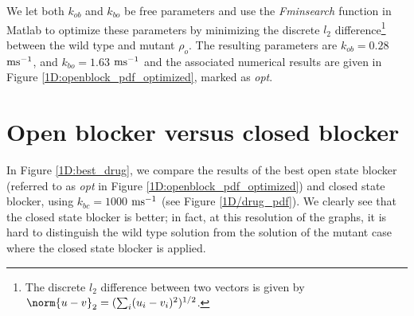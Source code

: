 We let both $k_{ob}$ and $k_{bo}$ be free parameters and use the {\it Fminsearch \label{Fminsearch}} function in Matlab to optimize these parameters by minimizing the discrete $l_2$ difference\footnote{The discrete $l_2$ difference between two vectors is given by
$\norm{u-v}_2=(\sum_i (u_i-v_i)^2)^{1/2}$.} between the wild type and mutant $\rho_o$. 
The resulting parameters are $k_{ob}=0.28$ $\rm{ms^{-1}}$, and $k_{bo}=1.63$ $\rm{ms^{-1}}$
and the associated numerical results are given in Figure \ref{1D:openblock_pdf_optimized}, marked as {\it opt}.

\section{Open blocker versus closed blocker}
In Figure  \ref{1D:best_drug}, we compare the results of the best open state blocker 
(referred to as {\it opt} in Figure  \ref{1D:openblock_pdf_optimized}) and closed state blocker, using $k_{bc}=1000$ $\rm{ms^{-1}}$ (see Figure
\ref{1D/drug_pdf}). We clearly see that the closed state blocker is better; in fact, at this resolution of the graphs, it is hard to distinguish the wild type solution from the solution of the mutant case where the closed state blocker is applied.

